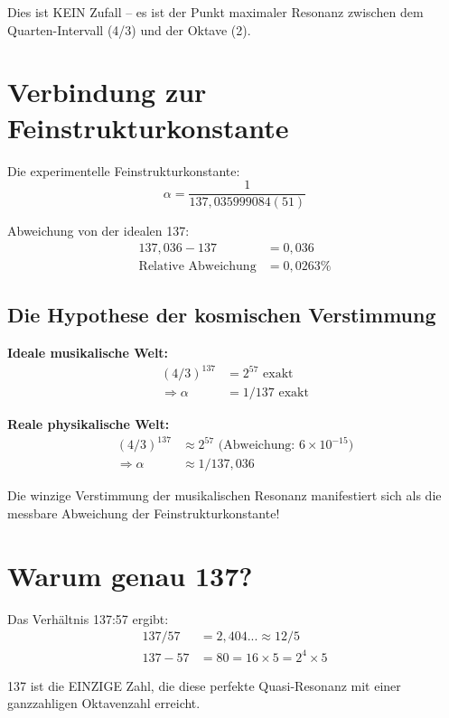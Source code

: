 \documentclass[12pt,a4paper]{article}
\begin{document}
	Dies ist KEIN Zufall -- es ist der Punkt maximaler Resonanz zwischen dem Quarten-Intervall (4/3) und der Oktave (2).
	
	\section{Verbindung zur Feinstrukturkonstante}
	
	Die experimentelle Feinstrukturkonstante:
	\begin{equation}
		\alpha = \frac{1}{137{,}035999084(51)}
	\end{equation}
	
	Abweichung von der idealen 137:
	\begin{align}
		137{,}036 - 137 &= 0{,}036\\
		\text{Relative Abweichung} &= 0{,}0263\%
	\end{align}
	
	\subsection{Die Hypothese der kosmischen Verstimmung}
	
	\textbf{Ideale musikalische Welt:}
	\begin{align}
		(4/3)^{137} &= 2^{57} \text{ exakt}\\
		\Rightarrow \alpha &= 1/137 \text{ exakt}
	\end{align}
	
	\textbf{Reale physikalische Welt:}
	\begin{align}
		(4/3)^{137} &\approx 2^{57} \text{ (Abweichung: } 6 \times 10^{-15}\text{)}\\
		\Rightarrow \alpha &\approx 1/137{,}036
	\end{align}
	
	Die winzige Verstimmung der musikalischen Resonanz manifestiert sich als die messbare Abweichung der Feinstrukturkonstante!
	
	\section{Warum genau 137?}
	
	Das Verhältnis 137:57 ergibt:
	\begin{align}
		137/57 &= 2{,}404... \approx 12/5\\
		137 - 57 &= 80 = 16 \times 5 = 2^4 \times 5
	\end{align}
	
	137 ist die EINZIGE Zahl, die diese perfekte Quasi-Resonanz mit einer ganzzahligen Oktavenzahl erreicht.
	
\end{document}
